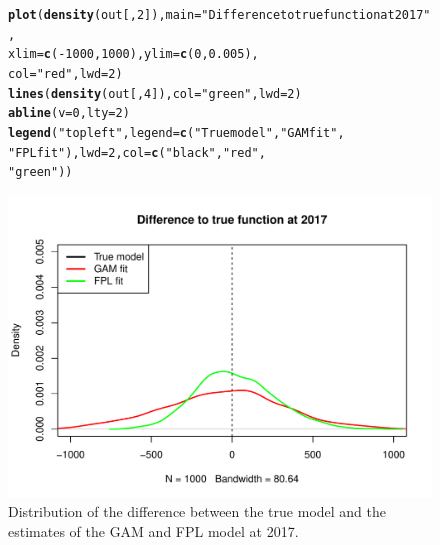 \documentclass{article}\usepackage[]{graphicx}\usepackage[]{color}
\makeatletter
\newcommand{\hlnum}[1]{\textcolor[rgb]{0.686,0.059,0.569}{#1}}%
\newcommand{\hlstr}[1]{\textcolor[rgb]{0.192,0.494,0.8}{#1}}%
\newcommand{\hlopt}[1]{\textcolor[rgb]{0,0,0}{#1}}%
\newcommand{\hlstd}[1]{\textcolor[rgb]{0.345,0.345,0.345}{#1}}%
\newcommand{\hlkwc}[1]{\textcolor[rgb]{0.333,0.667,0.333}{#1}}%
\newcommand{\hlkwd}[1]{\textcolor[rgb]{0.737,0.353,0.396}{\textbf{#1}}}%
\newenvironment{kframe}{%
 \def\at@end@of@kframe{}%
 \ifinner\ifhmode%
  \def\at@end@of@kframe{\end{minipage}}%
  \begin{minipage}{\columnwidth}%
 \fi\fi%
 \def\FrameCommand##1{\hskip\@totalleftmargin \hskip-\fboxsep
 \colorbox{shadecolor}{##1}\hskip-\fboxsep
     \hskip-\linewidth \hskip-\@totalleftmargin \hskip\columnwidth}%
 \MakeFramed {\advance\hsize-\width
   \@totalleftmargin\z@ \linewidth\hsize
   \@setminipage}}%
 {\par\unskip\endMakeFramed%
 \at@end@of@kframe}
\newenvironment{knitrout}{}{} %
\makeatother
\begin{document}
\begin{figure}
\begin{knitrout}
\color{fgcolor}\begin{kframe}
\begin{alltt}
\hlkwd{plot}\hlstd{(}\hlkwd{density}\hlstd{(out[,} \hlnum{2}\hlstd{]),} \hlkwc{main} \hlstd{=} \hlstr{"Difference to true function at 2017"}\hlstd{,}
    \hlkwc{xlim} \hlstd{=} \hlkwd{c}\hlstd{(}\hlopt{-}\hlnum{1000}\hlstd{,} \hlnum{1000}\hlstd{),} \hlkwc{ylim} \hlstd{=} \hlkwd{c}\hlstd{(}\hlnum{0}\hlstd{,} \hlnum{0.005}\hlstd{),}
    \hlkwc{col} \hlstd{=} \hlstr{"red"}\hlstd{,} \hlkwc{lwd} \hlstd{=} \hlnum{2}\hlstd{)}
\hlkwd{lines}\hlstd{(}\hlkwd{density}\hlstd{(out[,} \hlnum{4}\hlstd{]),} \hlkwc{col} \hlstd{=} \hlstr{"green"}\hlstd{,} \hlkwc{lwd} \hlstd{=} \hlnum{2}\hlstd{)}
\hlkwd{abline}\hlstd{(}\hlkwc{v} \hlstd{=} \hlnum{0}\hlstd{,} \hlkwc{lty} \hlstd{=} \hlnum{2}\hlstd{)}
\hlkwd{legend}\hlstd{(}\hlstr{"topleft"}\hlstd{,} \hlkwc{legend} \hlstd{=} \hlkwd{c}\hlstd{(}\hlstr{"True model"}\hlstd{,} \hlstr{"GAM fit"}\hlstd{,}
    \hlstr{"FPL fit"}\hlstd{),} \hlkwc{lwd} \hlstd{=} \hlnum{2}\hlstd{,} \hlkwc{col} \hlstd{=} \hlkwd{c}\hlstd{(}\hlstr{"black"}\hlstd{,} \hlstr{"red"}\hlstd{,}
    \hlstr{"green"}\hlstd{))}
\end{alltt}
\end{kframe}

\includegraphics[width=1\linewidth]{figure/plot9-1} \hfill{}



\end{knitrout}
\caption{Distribution of the difference between the true model and the estimates of the GAM and FPL model at 2017.}
\label{fig:plot9}
\end{figure}
\end{document}
